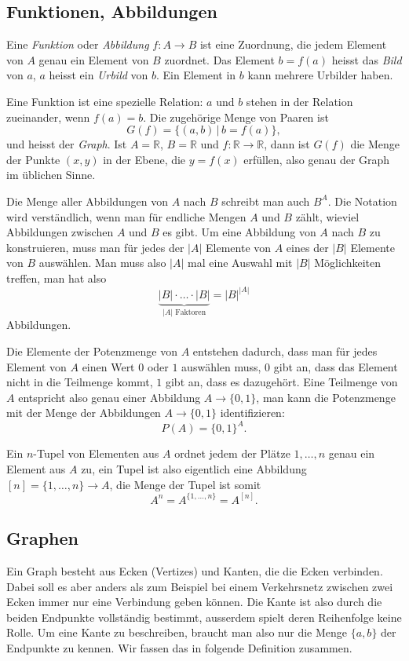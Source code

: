 \subsection{Funktionen, Abbildungen}
%
%
Eine {\em Funktion} oder {\em Abbildung} $f\colon A\to B$ ist
eine Zuordnung, die
jedem Element von $A$ genau ein Element von $B$ zuordnet.
%
%
Das Element
$b=f(a)$ heisst das {\em Bild} von $a$, $a$ heisst ein {\em Urbild} von $b$.
Ein
Element in $b$ kann mehrere Urbilder haben.

Eine Funktion ist eine spezielle Relation: 
$a$  und $b$ stehen in der Relation zueinander, wenn $f(a)=b$.
%
Die zugehörige Menge von Paaren ist
\[
G(f)=\{(a,b)\,|\,b=f(a)\},
\]
und heisst der {\em Graph}.
Ist $A=\mathbb R$, $B=\mathbb R$ und
$f\colon\mathbb R\to\mathbb R$, dann ist $G(f)$ die Menge
der Punkte $(x,y)$ in der Ebene, die $y=f(x)$ erfüllen, also
genau der Graph im üblichen Sinne.

%
Die Menge aller Abbildungen von $A$ nach $B$ schreibt man auch
$B^A$.
Die Notation wird verständlich, wenn man für endliche
Mengen $A$ und $B$ zählt, wieviel
Abbildungen zwischen $A$ und $B$ es gibt.
Um eine Abbildung von
$A$ nach $B$ zu konstruieren, muss man für jedes der $|A|$ Elemente von $A$
eines der $|B|$ Elemente von $B$ auswählen.
Man muss also $|A|$ mal
eine Auswahl mit $|B|$ Möglichkeiten treffen, man hat also
\[
\underbrace{|B|\cdot\dots\cdot|B|}_{\text{$|A|$ Faktoren}}=|B|^{|A|}
\]
Abbildungen.

Die Elemente der Potenzmenge von $A$ entstehen dadurch, dass man für jedes
Element von $A$ einen Wert $0$ oder $1$ auswählen muss, $0$ gibt an,
dass das Element nicht in die Teilmenge kommt, $1$ gibt an, dass es dazugehört.
Eine Teilmenge von $A$ entspricht also genau einer Abbildung $A\to\{0,1\}$,
man kann die Potenzmenge mit der Menge der Abbildungen $A\to\{0,1\}$
identifizieren:
\[
P(A) = \{0,1\}^{A}.
\]

Ein $n$-Tupel von Elementen aus $A$ ordnet jedem der Plätze
$1,\dots,n$ genau ein Element aus $A$ zu, ein Tupel ist also eigentlich
eine Abbildung $[n]=\{1,\dots,n\}\to A$, die Menge der Tupel ist somit
\[
A^n=A^{\{1,\dots,n\}}=A^{[n]}.
\]

\subsection{Graphen}
%
%
%
Ein Graph besteht aus Ecken (Vertizes) und Kanten,
die die Ecken verbinden.
Dabei
soll es aber anders als zum Beispiel bei einem Verkehrsnetz zwischen zwei
Ecken immer nur eine Verbindung geben können.
Die Kante ist also durch
die beiden Endpunkte vollständig bestimmt, ausserdem spielt deren
Reihenfolge keine Rolle.
Um eine Kante zu beschreiben, braucht man
also nur die Menge $\{a,b\}$ der Endpunkte zu kennen.
Wir fassen das in folgende Definition zusammen.

